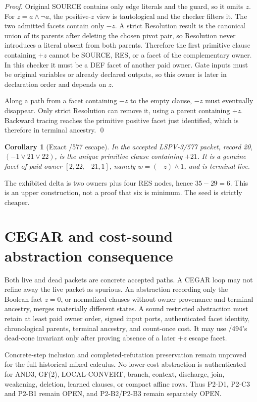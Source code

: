 \documentclass[11pt]{article}
\newtheorem{corollary}{Corollary}
\begin{document}
\begin{proof}
Original SOURCE contains only edge literals and the guard, so it omits $z$.
For $z=a\wedge\neg a$, the positive-$z$ view is tautological and the checker
filters it. The two admitted facets contain only $-z$. A strict Resolution
result is the canonical union of its parents after deleting the chosen pivot
pair, so Resolution never introduces a literal absent from both parents.
Therefore the first primitive clause containing $+z$ cannot be SOURCE, RES, or
a facet of the complementary owner. In this checker it must be a DEF facet of
another paid owner. Gate inputs must be original variables or already declared
outputs, so this owner is later in declaration order and depends on $z$.

Along a path from a facet containing $-z$ to the empty clause, $-z$ must
eventually disappear. Only strict Resolution can remove it, using a parent
containing $+z$. Backward tracing reaches the primitive positive facet just
identified, which is therefore in terminal ancestry. \qed
\end{proof}

\begin{corollary}[Exact /577 escape]
In the accepted LSPV-3/577 packet, record 20,
$(-1\vee21\vee22)$, is the unique primitive clause containing $+21$.
It is a genuine facet of paid owner $[2,22,-21,1]$, namely
$w=(-z)\wedge1$, and is terminal-live.
\end{corollary}

The exhibited delta is two owners plus four RES nodes, hence $35-29=6$.
This is an upper construction, not a proof that six is minimum. The seed is
strictly cheaper.

\section*{CEGAR and cost-sound abstraction consequence}
Both live and dead packets are concrete accepted paths. A CEGAR loop may not
refine away the live packet as spurious. An abstraction recording only the
Boolean fact $z=0$, or normalized clauses without owner provenance and terminal
ancestry, merges materially different states. A sound restricted abstraction
must retain at least paid owner order, signed input ports, authenticated facet
identity, chronological parents, terminal ancestry, and count-once cost. It may
use /494's dead-cone invariant only after proving absence of a later $+z$ escape
facet.

Concrete-step inclusion and completed-refutation preservation remain unproved
for the full historical mixed calculus. No lower-cost abstraction is
authenticated for AND3, GF(2), LOCAL-CONVERT, branch, context, discharge, join,
weakening, deletion, learned clauses, or compact affine rows. Thus P2-D1,
P2-C3 and P2-B1 remain OPEN, and P2-B2/P2-B3 remain separately OPEN.
\end{document}

